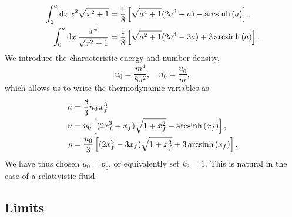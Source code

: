 %
\begin{align}
    \int_0^a \dd x \, x^2 \sqrt{x^2 + 1} 
    & = \frac{1}{8} 
    \left[\sqrt{a^4 + 1}(2 a^3 + a) - \operatorname{arcsinh}\left(a\right)\right], \\
    \int_0^a \dd x \, \frac{x^4}{\sqrt{x^2 + 1} }
    & = \frac{1}{8} 
    \left[\sqrt{a^2 + 1}(2 a^3 - 3a) + 3\operatorname{arcsinh}\left(a\right)\right].
\end{align}
%
We introduce the characteristic energy and number density,
% 
\begin{equation}
    u_0 = \frac{m^4}{8 \pi^2}, \quad n_0 = \frac{u_0}{m},
\end{equation}
%
which allows us to write the thermodynamic variables as
%
\begin{align}
    n &= \frac{8}{3}  n_0 \,x_f^3 \\
    \label{Fermi gas energy density}
    u &= u_0
    \left[(2x_f^3 + x_f) \sqrt{1 + x_f^2} - \operatorname{arcsinh}\left(x_f\right)\right], \\
    \label{Fermi gas pressure}
    p &= \frac{u_0}{3}
    \left[(2x_f^3 - 3x_f) \sqrt{1 + x_f^2} + 3\operatorname{arcsinh}\left(x_f\right)\right].
\end{align}
%
We have thus chosen $u_0 = p_0$, or equivalently set $k_3 = 1$.
This is natural in the case of a relativistic fluid.




\subsection{Limits}

